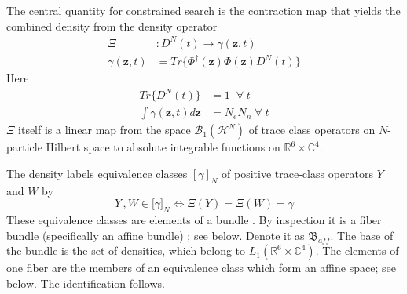 \documentclass[aps,preprint]{revtex4}%
\begin{document}
The central quantity for constrained search is the contraction map that yields
the combined density from the density operator
\begin{align}
\Xi &  :D^{N}(t)\rightarrow\gamma(\mathbf{z},t)\nonumber\\
\gamma(\mathbf{z},t)  &  =Tr\{\Phi^{\dagger}(\mathbf{z})\Phi(\mathbf{z}%
)D^{N}(t)\} \label{Xidefn}%
\end{align}
Here
\begin{align}
Tr\{D^{N}(t)\}  &  =1\;\;\forall\;t\nonumber\\
\int\gamma(\mathbf{z},t)d\mathbf{z}  &  =N_{e}N_{n}\;\forall\;t
\end{align}
$\Xi$ itself is a linear map from the space $\mathcal{B}_{1}(\mathcal{H}^{N})$
of trace class operators on $N$-particle Hilbert space to absolute integrable
functions on $\mathbb{R}^{6}\times\mathbb{C}^{4}$.

The density labels equivalence classes $[\gamma]_{N}$ of positive trace-class
operators $Y$ and $W$ by
\begin{equation}
Y\,,W\in\lbrack\gamma]_{N}\Leftrightarrow\Xi(Y)=\Xi(W)=\gamma
\end{equation}
These equivalence classes are elements of a bundle \cite{Bruhat}. By
inspection it is a fiber bundle (specifically an affine bundle)
\cite{affinebundleref}; see below. Denote it as $\mathfrak{B}_{aff}$. The base
of the bundle is the set of densities, which belong to $L_{1}(\mathbb{R}%
^{6}\times\mathbb{C}^{4})$. The elements of one fiber are the members of an
equivalence class which form an affine space; see below. The identification follows.
\end{document}
